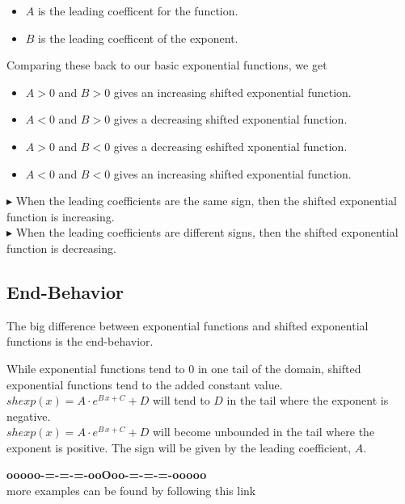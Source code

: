 \documentclass{ximera}
\begin{document}
\begin{itemize}
  \item $A$ is the leading coefficent for the function.
  \item $B$ is the leading coefficent of the exponent.
\end{itemize}


Comparing these back to our basic exponential functions, we get



\begin{itemize}
  \item $A > 0$ and $B > 0$ gives an increasing shifted exponential function.
  \item $A < 0$ and $B > 0$ gives a decreasing shifted exponential function.
  \item $A > 0$ and $B < 0$ gives a decreasing eshifted xponential function.
  \item $A < 0$ and $B < 0$ gives an increasing shifted exponential function.
\end{itemize}


$\blacktriangleright$ When the leading coefficients are the same sign, then the shifted exponential function is increasing. \\

$\blacktriangleright$ When the leading coefficients are different signs, then the shifted exponential function is decreasing. \\





\subsection*{End-Behavior}



The big difference between exponential functions and shifted exponential functions is the end-behavior. \



While exponential functions tend to $0$ in one tail of the domain, shifted exponential functions tend to the added constant value. \\



$shexp(x) = A \cdot e^{B \, x + C} + D$ will tend to $D$ in the tail where the exponent is negative. \\


$shexp(x) = A \cdot e^{B \, x + C} + D$ will become unbounded in the tail where the exponent is positive.  The sign will be given by the leading coefficient, $A$. \




\begin{center}
\textbf{\textcolor{green!50!black}{ooooo-=-=-=-ooOoo-=-=-=-ooooo}} \\

more examples can be found by following this link\\ 

\end{center}
\end{document}
